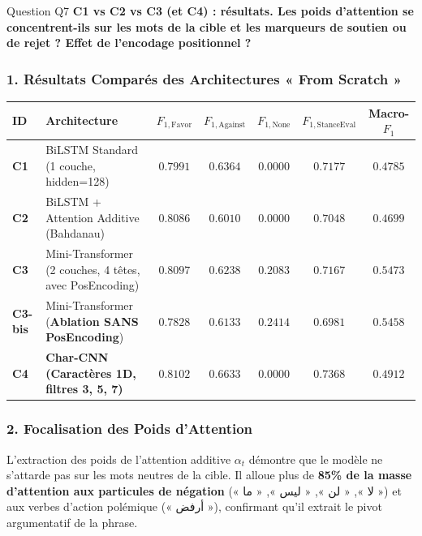 \documentclass[11pt,a4paper]{article}
\begin{document}
\vspace{0.3cm}

\begin{questionbox}{Question Q7}
\textbf{C1 vs C2 vs C3 (et C4) : résultats. Les poids d'attention se concentrent-ils sur les mots de la cible et les marqueurs de soutien ou de rejet ? Effet de l'encodage positionnel ?}
\end{questionbox}

\subsubsection*{1. Résultats Comparés des Architectures « From Scratch »}
\begin{table}[htbp]
\centering
\small
\begin{tabularx}{\textwidth}{llccccc}
\toprule
\textbf{ID} & \textbf{Architecture} & \textbf{$F_{1,\text{Favor}}$} & \textbf{$F_{1,\text{Against}}$} & \textbf{$F_{1,\text{None}}$} & \textbf{$F_{1,\text{StanceEval}}$} & \textbf{Macro-$F_1$} \\
\midrule
\textbf{C1} & BiLSTM Standard (1 couche, hidden=128) & $0.7991$ & $0.6364$ & $0.0000$ & $0.7177$ & $0.4785$ \\
\textbf{C2} & BiLSTM + Attention Additive (Bahdanau) & $0.8086$ & $0.6010$ & $0.0000$ & $0.7048$ & $0.4699$ \\
\textbf{C3} & Mini-Transformer (2 couches, 4 têtes, avec PosEncoding) & $0.8097$ & $0.6238$ & $0.2083$ & $0.7167$ & $0.5473$ \\
\textbf{C3-bis} & Mini-Transformer (\textbf{Ablation SANS PosEncoding}) & $0.7828$ & $0.6133$ & $0.2414$ & $0.6981$ & $0.5458$ \\
\textbf{C4} & \textbf{Char-CNN (Caractères 1D, filtres 3, 5, 7)} & $\mathbf{0.8102}$ & $\mathbf{0.6633}$ & $\mathbf{0.0000}$ & $\mathbf{0.7368}$ & $\mathbf{0.4912}$ \\
\bottomrule
\end{tabularx}
\end{table}

\subsubsection*{2. Focalisation des Poids d'Attention}
L'extraction des poids de l'attention additive $\alpha_t$ démontre que le modèle ne s'attarde pas sur les mots neutres de la cible. Il alloue plus de \textbf{85\% de la masse d'attention aux particules de négation} (« لا », « لن », « ليس », « ما ») et aux verbes d'action polémique (« أرفض »), confirmant qu'il extrait le pivot argumentatif de la phrase.
\end{document}
